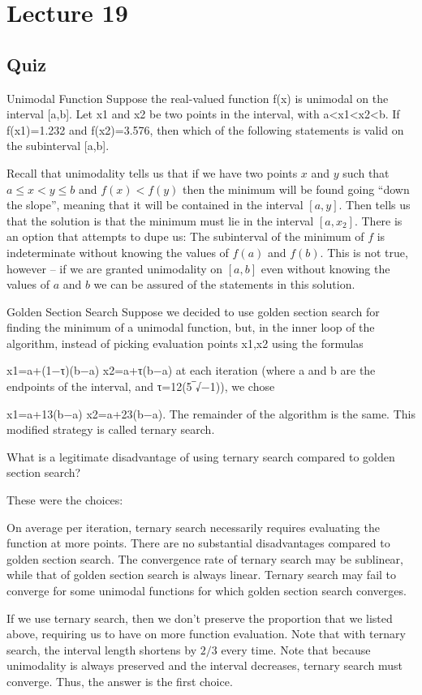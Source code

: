\documentclass[../main.tex]{subfiles}
\begin{document}
\section{Lecture 19}

\subsection{Quiz}
Unimodal Function
Suppose the real-valued function f(x) is unimodal on the interval [a,b]. Let x1 and x2 be two points in the interval, with a<x1<x2<b. If f(x1)=1.232 and f(x2)=3.576, then which of the following statements is valid on the subinterval [a,b].

\begin{solution}
    Recall that unimodality tells us that if we have two points $x$ and $y$ such that $a \leq x < y \leq b$ and $f(x) < f(y)$ then the minimum will be found going ``down the slope'', meaning that it will be contained in the interval $[a,y]$. Then tells us that the solution is that the minimum must lie in the interval $[a, x_2]$. There is an option that attempts to dupe us: The subinterval of the minimum of $f$ is indeterminate without knowing the values of $f(a)$ and $f(b)$. This is not true, however -- if we are granted unimodality on $[a,b]$ even without knowing the values of $a$ and $b$ we can be assured of the statements in this solution.
\end{solution}

Golden Section Search
Suppose we decided to use golden section search for finding the minimum of a unimodal function, but, in the inner loop of the algorithm, instead of picking evaluation points x1,x2 using the formulas

x1=a+(1−τ)(b−a)
x2=a+τ(b−a)
at each iteration (where a and b are the endpoints of the interval, and τ=12(5‾√−1)), we chose

x1=a+13(b−a)
x2=a+23(b−a).
The remainder of the algorithm is the same. This modified strategy is called ternary search.

What is a legitimate disadvantage of using ternary search compared to golden section search?

\begin{solution}
    These were the choices:

    On average per iteration, ternary search necessarily requires evaluating the function at more points.
There are no substantial disadvantages compared to golden section search.
The convergence rate of ternary search may be sublinear, while that of golden section search is always linear.
Ternary search may fail to converge for some unimodal functions for which golden section search converges.

    If we use ternary search, then we don't preserve the proportion that we listed above, requiring us to have on more function evaluation. Note that with ternary search, the interval length shortens by $2/3$ every time. Note that because unimodality is always preserved and the interval decreases, ternary search must converge.
    Thus, the answer is the first choice.
    
\end{solution}
\end{document}
